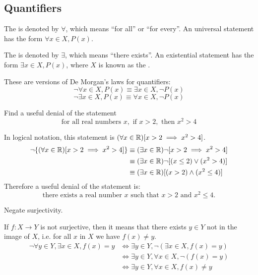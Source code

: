 \subsection{Quantifiers}
The  is denoted by $\forall$, which means ``for all'' or ``for every''. An universal statement has the form $\forall x\in X, P(x)$.

The  is denoted by $\exists$, which means ``there exists''. An existential statement has the form $\exists x\in X, P(x)$, where $X$ is known as the .

These are versions of De Morgan's laws for quantifiers:
\[ \lnot \forall x\in X,P(x) \equiv \exists x\in X,\lnot P(x) \]
\[ \lnot \exists x\in X,P(x) \equiv \forall x\in X,\lnot P(x) \]

\begin{exercise}{}{}
Find a useful denial of the statement
\[ \text{for all real numbers } x, \text{ if } x>2, \text{ then } x^2>4 \]
\end{exercise}
\begin{solution}
In logical notation, this statement is $(\forall x \in \mathbb R)[x>2 \implies x^2>4]$.
\begin{align*}
\lnot\{(\forall x \in \mathbb R)[x>2 \implies x^2>4]\} 
&\equiv (\exists x \in \mathbb R) \lnot[x>2 \implies x^2>4] \\
&\equiv (\exists x \in \mathbb R) \lnot [(x\le2) \lor (x^2>4)] \\
&\equiv (\exists x \in \mathbb R) [(x>2) \land (x^2\le4)]
\end{align*}
Therefore a useful denial of the statement is:
\[ \text{there exists a real number } x \text{ such that } x>2 \text{ and } x^2\le4. \] 
\end{solution}

\begin{exercise}{}{}
Negate surjectivity.
\end{exercise}
\begin{solution}
If $f:X\to Y$ is not surjective, then it means that there exists $y \in Y$ not in the image of $X$, i.e. for all $x$ in $X$ we have $f(x)\neq y$.
\begin{align*}
\lnot \forall y \in Y, \exists x \in X, f(x)=y 
&\iff \exists y \in Y, \lnot (\exists x \in X, f(x)=y) \\
&\iff \exists y \in Y, \forall x \in X, \lnot (f(x)=y) \\
&\iff \exists y \in Y, \forall x \in X, f(x) \neq y
\end{align*}
\end{solution}

